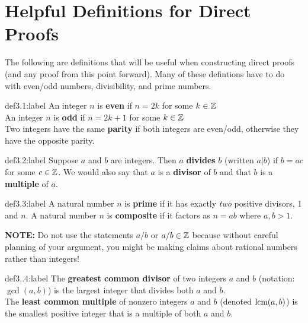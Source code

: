 \section{Helpful Definitions for Direct Proofs}

The following are definitions that will be useful when constructing direct proofs (and any proof from this point forward). Many of these defintions have to do with even/odd numbers, divisibility, and prime numbers.

\begin{definition}{def3.1:label}
    An integer $n$ is \textbf{even} if $n=2k$ for some $k \in \mathbb{Z}$\\

    An integer $n$ is \textbf{odd} if $n=2k+1$ for some $k \in \mathbb{Z}$\\

    Two integers have the same \textbf{parity} if both integers are even/odd, otherwise they have the opposite parity.
\end{definition}

\begin{definition}{def3.2:label}
    Suppose $a$ and $b$ are integers. Then $a$ \textbf{divides} $b$ (written $a|b$) if $b = ac$ for some $c\in \mathbb{Z}$. We would also say that $a$ is a \textbf{divisor} of $b$ and that $b$ is a \textbf{multiple} of $a$. 
\end{definition}

\begin{definition}{def3.3:label}
    A natural number $n$ is \textbf{prime} if it has exactly \textit{two} positive divisors, 1 and $n$. A natural number $n$ is \textbf{composite} if it factors as $n=ab$ where $a,b>1$.
\end{definition}

\textbf{NOTE:} Do not use the statements $a/b$ or $a/b \in \mathbb{Z}$ because without careful planning of your argument, you might be making claims about rational numbers rather than integers!
\newpage

\begin{definition}{def3..4:label}
    The \textbf{greatest common divisor} of two integers $a$ and $b$ (notation: $\gcd(a,b)$) is the largest integer that divides both $a$ and $b$. \\

    The \textbf{least common multiple} of nonzero integers $a$ and $b$ (denoted $\text{lcm}(a,b)$) is the smallest positive integer that is a multiple of both $a$ and $b$.
\end{definition}

